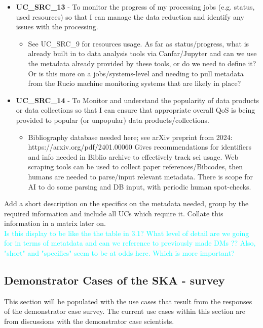 \begin{itemize}[label={}]
\begin{itemize}[label={}]
    \end{itemize}
    \item {\bf UC\_SRC\_13} - To monitor the progress of my processing jobs (e.g. status, used resources) so that I can manage the data reduction and identify any issues with the processing.
    \begin{itemize}[label={}]
        \item See UC\_SRC\_9 for resources usage.  As far as status/progress, what is already built in to data analysis tools via Canfar/Jupyter and can we use the metadata already provided by these tools, or do we need to define it?  Or is this more on a jobs/systems-level and needing to pull metadata from the Rucio machine monitoring systems that are likely in place?
    \end{itemize}
    \item {\bf UC\_SRC\_14} - To Monitor and understand the popularity of data products or data collections so that I can ensure that appropriate overall QoS is being provided to popular (or unpopular) data products/collections.
    \begin{itemize}[label={}]
        \item Bibliography database needed here; see arXiv preprint from 2024: 
        https://arxiv.org/pdf/2401.00060 
        Gives recommendations for identifiers and info needed in Biblio archive to effectively track sci usage.  Web scraping tools can be used to collect paper references/Bibcodes, then humans are needed to parse/input relevant metadata.  There is scope for AI to do some parsing and DB input, with periodic human spot-checks.
    \end{itemize}
\end{itemize}


Add a short description on the specifics on the metadata needed, group by the required information and include all UCs which require it. 
Collate this information in a matrix later on. 
\\
\textcolor{cyan}{
Is this display to be like the the table in 3.1?  
What level of detail are we going for in terms of metatdata and can we reference to previously made DMs ??
Also, "short" and "specifics" seem to be at odds here.  Which is more important?  
}

 \subsection{Demonstrator Cases of the SKA - survey}

This section will be populated with the use cases that result from the responses of the demonstrator case survey. The current use cases within this section are from discussions with the demonstrator case scientists.

